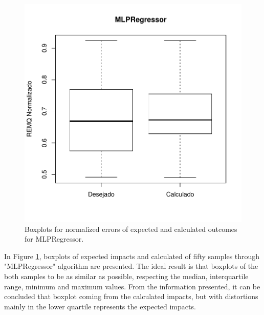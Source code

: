 \begin{figure}[!h]
  \vspace{-0.2cm}
  \centering
  \includegraphics[trim = 1mm 12mm 1mm 1mm,clip,width=0.7\columnwidth]{image/mlpreg_ex4.pdf}
  \caption{Boxplots for normalized errors of expected and calculated outcomes for MLPRegressor.}
  \label{fig:anns_result_7}
\end{figure}

In Figure \ref{fig:anns_result_7}, boxplots of expected impacts and calculated of fifty samples through "MLPRegressor" algorithm are presented. The ideal result is that boxplots of the both samples to be as similar as possible, respecting the median, interquartile range, minimum and maximum values. From the information presented, it can be concluded that boxplot coming from the calculated impacts, but with distortions mainly in the lower quartile represents the expected impacts.

